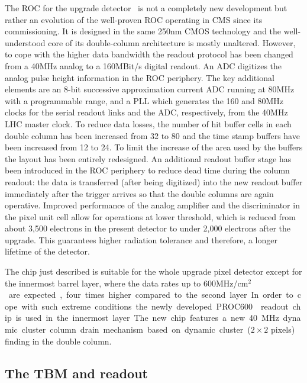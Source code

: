The ROC for the upgrade detector~\cite{Kastli201388} is not a completely new development but rather an evolution of the well-proven ROC operating in CMS since its commissioning.
It is designed in the same 250\unit{nm} CMOS technology and the well-understood core of its double-column architecture is mostly unaltered.
However, to cope with the higher data bandwidth the readout protocol has been changed from a 40\unit{MHz} analog to a 160\unit{MBit/s} digital readout. An ADC digitizes the analog pulse height information in the ROC periphery.
The key additional elements are an 8-bit successive approximation current ADC running at 80\unit{MHz} with a programmable range, and a PLL which generates the 160 and 80\unit{MHz} clocks for the serial readout links and the ADC, respectively, from the 40\unit{MHz} LHC master clock.
To reduce data losses, the number of hit buffer cells in each double column has been increased from 32 to 80 and the time stamp buffers have been increased from 12 to 24.
To limit the increase of the area used by the buffers the layout has been entirely redesigned.
An additional readout buffer stage has been introduced in the ROC periphery to reduce dead time during the column readout: the data is transferred (after being digitized) into the new readout buffer immediately after the trigger arrives so that the double columns are again operative.
Improved performance of the analog amplifier and the discriminator in the pixel unit cell allow for operations at lower threshold, which is reduced from about 3,500 electrons in the present detector to under 2,000 electrons after the upgrade. This guarantees higher radiation tolerance and therefore, a longer lifetime of the detector.

The chip just described is suitable for the whole upgrade pixel detector except for the innermost barrel layer, where the data rates up to 600\unit{MHz/cm$^2$} are expected, four times higher compared to the second layer.
In order to cope with such extreme conditions the newly developed PROC600~\cite{Starodumov:2227967} readout chip is used in the innermost layer. The new chip features a new 40\unit{MHz} dynamic cluster column drain mechanism based on dynamic cluster ($2\times2$ pixels) finding in the double column.

\subsection{The TBM and readout}\label{subsec:Phase1TBM}

